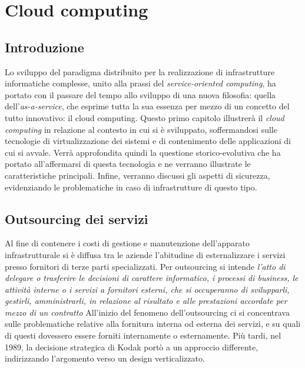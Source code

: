 \chapter{Cloud computing}
\section{Introduzione}
Lo sviluppo del paradigma distribuito per la realizzazione di infrastrutture informatiche complesse, unito alla prassi del \textit{service-oriented computing}, ha portato con il passare del tempo allo sviluppo di una nuova filosofia: quella dell'\textit{as-a-service}, che esprime tutta la sua essenza per mezzo di un concetto del tutto innovativo: il cloud computing.
Questo primo capitolo illustrerà il \textit{cloud computing} in relazione al contesto in cui si è sviluppato, soffermandosi sulle tecnologie di virtualizzazione dei sistemi e di contenimento delle applicazioni di cui si avvale.
Verrà approfondita quindi la questione storico-evolutiva che ha portato all'affermarsi di questa tecnologia e ne verranno illustrate le caratteristiche principali.
Infine, verranno discussi gli aspetti di sicurezza, evidenziando le problematiche in caso di infrastrutture di questo tipo.

\section{Outsourcing dei servizi}
Al fine di contenere i costi di gestione e manutenzione dell'apparato infrastrutturale si è diffusa tra le aziende l'abitudine di esternalizzare i servizi presso fornitori di terze parti specializzati.
Per outsourcing si intende \textit{l'atto di delegare o trasferire le decisioni di carattere informatico, i processi di business, le attività interne o i servizi a fornitori esterni, che si occuperanno di svilupparli, gestirli, amministrarli, in relazione al risultato e alle prestazioni accordate per mezzo di un contratto}\cite{OutsourcingCloudDhardBalakrishnan}
All'inizio del fenomeno dell'outsourcing ci si concentrava sulle problematiche relative alla fornitura interna od esterna dei servizi, e su quali di questi dovessero essere forniti internamente o esternamente. Più tardi, nel 1989, la decisione strategica di Kodak portò a un approccio differente, indirizzando l'argomento verso un design verticalizzato.\cite{OutsourcingCloud2}


